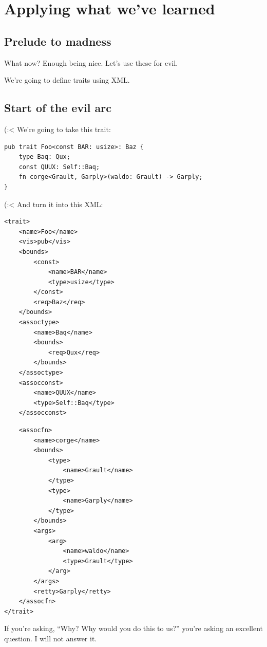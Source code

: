\documentclass{beamer}
\begin{document}
	\section{Applying what we've learned}
	\subsection{Prelude to madness}
	\begin{frame}{What now?}
		Enough being nice. Let's use these for evil.

		\pause

		We're going to define traits using XML.
	\end{frame}

	\subsection{Start of the evil arc}
	\begin{frame}[fragile]{(:<}
		We're going to take this trait:

		\begin{verbatim}
pub trait Foo<const BAR: usize>: Baz {
	type Baq: Qux;
	const QUUX: Self::Baq;
	fn corge<Grault, Garply>(waldo: Grault) -> Garply;
}
		\end{verbatim}
	\end{frame}

	\begin{frame}[fragile]{(:<}
		And turn it into this XML:
		\begin{center}
			\begin{minipage}{0.45\linewidth}
				\begin{verbatim}
<trait>
	<name>Foo</name>
	<vis>pub</vis>
	<bounds>
		<const>
			<name>BAR</name>
			<type>usize</type>
		</const>
		<req>Baz</req>
	</bounds>
	<assoctype>
		<name>Baq</name>
		<bounds>
			<req>Qux</req>
		</bounds>
	</assoctype>
	<assocconst>
		<name>QUUX</name>
		<type>Self::Baq</type>
	</assocconst>
				\end{verbatim}
			\end{minipage}
			\hfill
			\begin{minipage}{0.45\linewidth}
				\begin{verbatim}
    <assocfn>
		<name>corge</name>
		<bounds>
			<type>
				<name>Grault</name>
			</type>
			<type>
				<name>Garply</name>
			</type>
		</bounds>
		<args>
			<arg>
				<name>waldo</name>
				<type>Grault</type>
			</arg>
		</args>
		<retty>Garply</retty>
	</assocfn>
</trait>
				\end{verbatim}
			\end{minipage}
		\end{center}

		\pause

		If you're asking, ``Why? Why would you do this to us?'' you're asking an excellent question.
		\pause I will not answer it.
	\end{frame}
\end{document}
